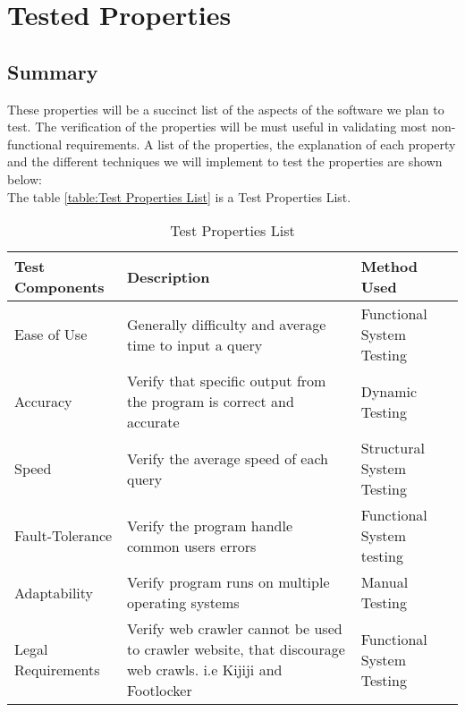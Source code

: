 \documentclass[12pt, titlepage]{article}
\begin{document}
\section{Tested Properties}
\subsection{Summary}

These properties will be a succinct list of the aspects of the software we plan to test. The verification of the properties will be must useful in validating most non-functional requirements. A list of the properties, the explanation of each property and the different techniques we will implement to test the properties are shown below:\\

The table \ref{table:Test Properties  List} is a Test Properties  List.

\begin{table}[h!]
    \begin{tabular}{| p{5cm} | p{5cm} | p{5cm} |}    \hline
    Test Components  &	Description	&  Method Used\\ \hline
   Ease of Use & Generally difficulty and average time to input a query	&   Functional System Testing\\ \hline
   
  Accuracy & Verify that specific output from the program is correct and accurate	& Dynamic Testing \\ \hline
    
    Speed  & Verify the average speed of each query &  Structural System Testing\\ \hline
     
     Fault-Tolerance	& Verify the program handle common users errors &  Functional System testing  \\ \hline
      
           Adaptability & Verify program runs on multiple operating systems	& Manual Testing \\ \hline
            
                  Legal Requirements & Verify web crawler cannot be used to crawler website, that discourage web crawls. i.e Kijiji and Footlocker	&  Functional System Testing \\ \hline
      
    \end{tabular}
    \caption{Test Properties List}
\label{table:Test Properties List}
\end{table}
\end{document}
